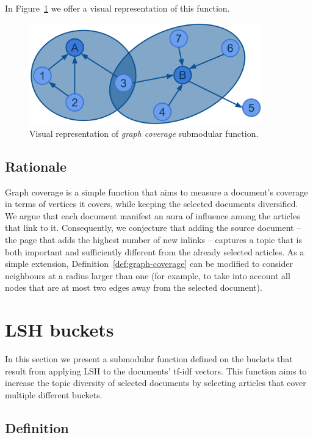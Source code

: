 In Figure~\ref{fig:graph-cov} we offer a visual representation of this function.
\begin{figure}
  \centering
  \includegraphics[width=0.9\textwidth,natwidth=1671,natheight=731]{images/graph-cov.png}
  \caption{Visual representation of \emph{graph coverage} submodular function.}
  \label{fig:graph-cov}
\end{figure}

\subsection{Rationale}

Graph coverage is a simple function that aims to measure a document's coverage
in terms of vertices it covers, while keeping the selected documents
diversified.
We argue that each document manifest an aura of influence among the articles
that link to it.
Consequently, we conjecture that adding the source document -- the page
that adds the highest number of new inlinks -- captures a topic that is both
important and sufficiently different from the already selected articles.
As a simple extension, Definition~\vref{def:graph-coverage} can be modified to
consider neighbours at a radius larger than one (for example, to take into
account all nodes that are at most two edges away from the selected document).

\section{LSH buckets}
\label{sec:lsh-buckets}

In this section we present a submodular function defined on the buckets that
result from applying \acl{LSH} to the documents' tf-idf vectors. This function
aims to increase the topic diversity of selected documents by selecting
articles that cover multiple different buckets.

\subsection{Definition}


